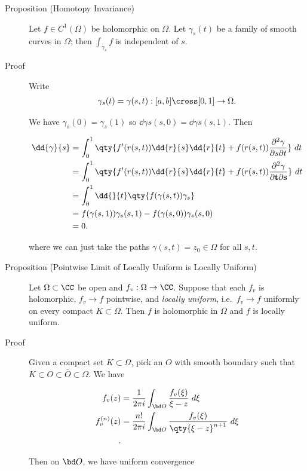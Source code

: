\begin{description}
\item[Proposition (Homotopy Invariance)]
Let \(f\in C^1(\Omega)\) be holomorphic on \(\Omega\). Let
\(\gamma_s(t)\) be a family of smooth curves in \(\Omega\); then
\(\int_{\gamma_s} f\) is independent of \(s\).
\item[Proof]
Write
\begin{align*}\gamma_s(t) = \gamma(s, t): [a, b] \cross [0, 1] \to \Omega.\end{align*}

We have \(\gamma_s(0) = \gamma_s(1)\) so
\(\dd{\gamma}{s}(s, 0) = \dd{\gamma}{s}(s, 1)\). Then

\begin{align*}
\dd{\gamma}{s} 
&= \int_0^1 \qty{ f'(r(s, t)) \dd{r}{s} \dd{r}{t} + f(r(s, t)) \frac{\partial^2 \gamma}{\partial s \partial t} } ~dt \\
&= \int_0^1 \qty{ f'(r(s, t)) \dd{r}{s} \dd{r}{t} + f(r(s, t)) \frac{\partial^2 \gamma}{\partial \mathbf{t} \partial \mathbf{s}} } ~dt \\
&= \int_0^1 \dd{}{t} \qty{ f(\gamma(s, t))  \gamma_s } \\
&= f(\gamma(s, 1))\gamma_s(s, 1) - f(\gamma(s, 0)) \gamma_s(s, 0) \\
&= 0
.\end{align*}

where we can just take the paths \(\gamma(s, t) = z_0 \in \Omega\) for
all \(s, t\).
\item[Proposition (Pointwise Limit of Locally Uniform is Locally
Uniform)]
Let \(\Omega \subset \CC\) be open and \(f_v: \Omega \to \CC\). Suppose
that each \(f_v\) is holomorphic, \(f_v \to f\) pointwise, and
\emph{locally uniform}, i.e.~\(f_v \to f\) uniformly on every compact
\(K \subset \Omega\). Then \(f\) is holomorphic in \(\Omega\) and \(f\)
is locally uniform.
\item[Proof]
Given a compact set \(K \subset \Omega\), pick an \(O\) with smooth
boundary such that \(K \subset O \subset \bar O \subset \Omega\). We
have

\begin{align*}
f_v(z) &= \frac{1}{2\pi i} \int_{\bd O} \frac{f_v(\xi)}{\xi - z}~d\xi \\
f_v^{(n)}(z) &= \frac{n!}{2\pi i} \int_{\bd O} \frac{f_v(\xi)}{\qty{ \xi - z}^{n+1} }~d\xi \\
.\end{align*}

Then on \(\bd O\), we have uniform convergence


\end{description}
